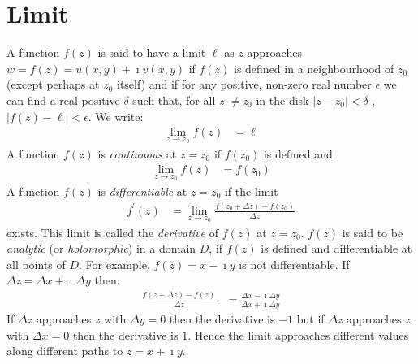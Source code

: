 \documentclass[a4paper,twoside,10pt,english]{report}
\begin{document}
\section{Limit}
A function \emph{$f\left(z\right)$} is said to have a limit \emph{$\ell$} as
\emph{$z$} approaches \emph{$w=f\left(z\right)=u(x,y)+\imath v(x,y)$} if $f\left(z\right)$
is defined in a neighbourhood of $z_{0}$ (except perhaps at
$z_{0}$ itself) and if for any positive, non-zero real number
$\epsilon$ we can find a real positive $\delta$ such that, for all
\emph{z $\neq$z$_{0}$} in the disk $\left|z-z_{0}\right|<\delta$
, $\left|f\left(z\right)-\ell\right|<\epsilon$. We write:
\begin{align*}
\lim_{z\rightarrow z_{0}}f\left(z\right) & = \ell
\end{align*}
A function \emph{$f\left(z\right)$} is \emph{continuous} at $z=z_{0}$ if $f(z_{0})$
is defined and 
\begin{align*}
\lim_{z\rightarrow z_{0}}f\left(z\right) & = f(z_{0})
\end{align*}
A function \emph{$f\left(z\right)$} is \emph{differentiable} at $z=z_{0}$ if
the limit
\begin{align*}
f^{\prime}\left(z\right) & = \lim_{z\rightarrow z_{0}}\frac{f(z_{0}+\Delta z)-f(z_{0})}{\Delta z}
\end{align*}
exists. This limit is called the \emph{derivative} of\emph{ $f\left(z\right)$
}at $z=z_{0}$. $f\left(z\right)$ is said to be \emph{analytic} (or \emph{holomorphic})
in a domain $D$, if $f\left(z\right)$ is defined and differentiable at all
points of $D$. For example, $f\left(z\right)=x-\imath y$ is not differentiable.
If $\Delta z=\Delta x+\imath\Delta y$ then:
\begin{align*}
\frac{f(z+\Delta z)-f\left(z\right)}{\Delta z} & = \frac{\Delta x-\imath\Delta y}{\Delta x+\imath\Delta y}
\end{align*}
If $\Delta z$ approaches $z$ with $\Delta y=0$ then the derivative
is $-1$ but if $\Delta z$ approaches $z$ with $\Delta x=0$ then
the derivative is $1$. Hence the limit approaches different values
along different paths to $z=x+\imath y$.
\end{document}
